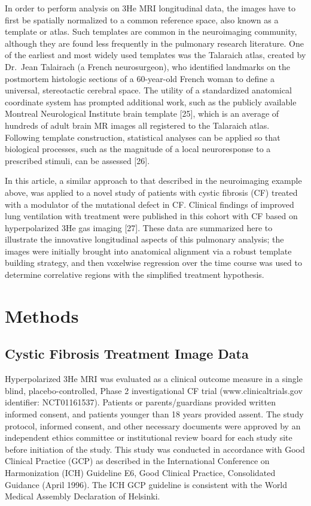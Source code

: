\documentclass[11pt,]{article}
\begin{document}
In order to perform analysis on 3He MRI longitudinal data, the images
have to first be spatially normalized to a common reference space, also
known as a template or atlas. Such templates are common in the
neuroimaging community, although they are found less frequently in the
pulmonary research literature. One of the earliest and most widely used
templates was the Talaraich atlas, created by Dr.~Jean Talairach (a
French neurosurgeon), who identified landmarks on the postmortem
histologic sections of a 60-year-old French woman to define a universal,
stereotactic cerebral space. The utility of a standardized anatomical
coordinate system has prompted additional work, such as the publicly
available Montreal Neurological Institute brain template {[}25{]}, which
is an average of hundreds of adult brain MR images all registered to the
Talaraich atlas. Following template construction, statistical analyses
can be applied so that biological processes, such as the magnitude of a
local neuroresponse to a prescribed stimuli, can be assessed {[}26{]}.

In this article, a similar approach to that described in the
neuroimaging example above, was applied to a novel study of patients
with cystic fibrosis (CF) treated with a modulator of the mutational
defect in CF. Clinical findings of improved lung ventilation with
treatment were published in this cohort with CF based on hyperpolarized
3He gas imaging {[}27{]}. These data are summarized here to illustrate
the innovative longitudinal aspects of this pulmonary analysis; the
images were initially brought into anatomical alignment via a robust
template building strategy, and then voxelwise regression over the time
course was used to determine correlative regions with the simplified
treatment hypothesis.

\section{Methods}\label{methods}

\subsection{Cystic Fibrosis Treatment Image
Data}\label{cystic-fibrosis-treatment-image-data}

Hyperpolarized 3He MRI was evaluated as a clinical outcome measure in a
single blind, placebo-controlled, Phase 2 investigational CF trial
(www.clinicaltrials.gov identifier: NCT01161537). Patients or
parents/guardians provided written informed consent, and patients
younger than 18 years provided assent. The study protocol, informed
consent, and other necessary documents were approved by an independent
ethics committee or institutional review board for each study site
before initiation of the study. This study was conducted in accordance
with Good Clinical Practice (GCP) as described in the International
Conference on Harmonization (ICH) Guideline E6, Good Clinical Practice,
Consolidated Guidance (April 1996). The ICH GCP guideline is consistent
with the World Medical Assembly Declaration of Helsinki.
\end{document}
